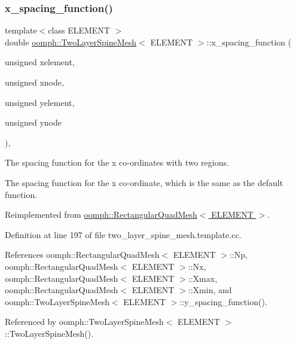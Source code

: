 \subsubsection{\texorpdfstring{x\+\_\+spacing\+\_\+function()}{x\_spacing\_function()}}
{\footnotesize\ttfamily template$<$class E\+L\+E\+M\+E\+NT $>$ \\
double \hyperlink{classoomph_1_1TwoLayerSpineMesh}{oomph\+::\+Two\+Layer\+Spine\+Mesh}$<$ E\+L\+E\+M\+E\+NT $>$\+::x\+\_\+spacing\+\_\+function (\begin{DoxyParamCaption}\item[{unsigned}]{xelement,  }\item[{unsigned}]{xnode,  }\item[{unsigned}]{yelement,  }\item[{unsigned}]{ynode }\end{DoxyParamCaption})\hspace{0.3cm}{\ttfamily [protected]}, {\ttfamily [virtual]}}



The spacing function for the x co-\/ordinates with two regions. 

The spacing function for the x co-\/ordinate, which is the same as the default function. 

Reimplemented from \hyperlink{classoomph_1_1RectangularQuadMesh_ad4c2f349cf201cb3107f0a4e5447c16f}{oomph\+::\+Rectangular\+Quad\+Mesh$<$ E\+L\+E\+M\+E\+N\+T $>$}.



Definition at line 197 of file two\+\_\+layer\+\_\+spine\+\_\+mesh.\+template.\+cc.



References oomph\+::\+Rectangular\+Quad\+Mesh$<$ E\+L\+E\+M\+E\+N\+T $>$\+::\+Np, oomph\+::\+Rectangular\+Quad\+Mesh$<$ E\+L\+E\+M\+E\+N\+T $>$\+::\+Nx, oomph\+::\+Rectangular\+Quad\+Mesh$<$ E\+L\+E\+M\+E\+N\+T $>$\+::\+Xmax, oomph\+::\+Rectangular\+Quad\+Mesh$<$ E\+L\+E\+M\+E\+N\+T $>$\+::\+Xmin, and oomph\+::\+Two\+Layer\+Spine\+Mesh$<$ E\+L\+E\+M\+E\+N\+T $>$\+::y\+\_\+spacing\+\_\+function().



Referenced by oomph\+::\+Two\+Layer\+Spine\+Mesh$<$ E\+L\+E\+M\+E\+N\+T $>$\+::\+Two\+Layer\+Spine\+Mesh().

\mbox{\label{classoomph_1_1TwoLayerSpineMesh_a2d05d5228e3831021ab48dd429ada890}} 
